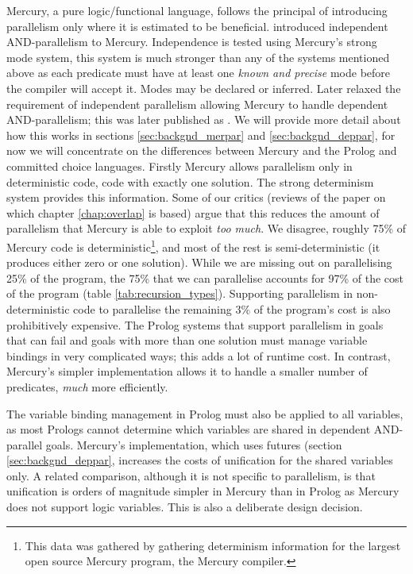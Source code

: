 Mercury,
a pure logic/functional language,
follows the principal of introducing parallelism only where it is
estimated to be beneficial.
\citet{conway:2002:par} introduced independent AND-parallelism
to Mercury.
Independence is tested using Mercury's strong mode system,
this system is much stronger than any of the systems mentioned above as
each predicate must have at least one \emph{known and precise} mode before
the compiler will accept it.
Modes may be declared or inferred.
Later \citet{wang:2006:hons} relaxed the requirement of independent
parallelism allowing Mercury to handle dependent AND-parallelism;
this was later published as \citet{wang:2011:dep-par}.
We will provide more detail about how this works in sections
\ref{sec:backgnd_merpar} and \ref{sec:backgnd_deppar},
for now we will concentrate on the differences between Mercury
and the Prolog and committed choice languages.
Firstly
Mercury allows parallelism only in deterministic code,
code with exactly one solution.
The strong determinism system provides this information.
Some of our critics (reviews of the paper \citet{bone:2011:overlap}
on which chapter \ref{chap:overlap} is based)
argue that this reduces the amount of parallelism that Mercury is able
to exploit \emph{too much}.
We disagree,
roughly 75\% of Mercury code is deterministic\footnote{
    This data was gathered by gathering determinism information for the
    largest open source Mercury program, the Mercury compiler.
}, and most of the rest is semi-deterministic
(it produces either zero or one solution).
While we are missing out on parallelising 25\% of the
program,
the 75\% that we can parallelise accounts for 97\% of the cost of the
program (table \ref{tab:recursion_types}).
Supporting parallelism in non-deterministic code to parallelise the
remaining 3\% of the program's cost is also prohibitively expensive.
The Prolog systems that support parallelism in goals that can fail and
goals with more than one solution must manage variable bindings
in very complicated ways;
this adds a lot of runtime cost.
In contrast, Mercury's simpler implementation allows it to handle a
smaller number of predicates, \emph{much} more efficiently.

The variable binding management in Prolog must also be applied to all
variables,
as most Prologs cannot determine which variables are shared in dependent
AND-parallel goals.
Mercury's implementation,
which uses futures (section \ref{sec:backgnd_deppar},
increases the costs of unification for the shared variables only.
A related comparison, although it is not specific to parallelism,
is that unification is orders of magnitude simpler in Mercury than in
Prolog as Mercury does not support logic variables.
This is also a deliberate design decision.

